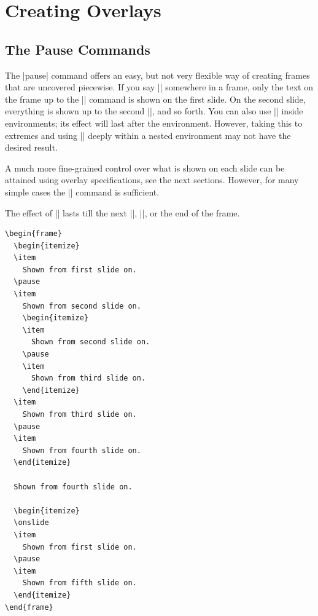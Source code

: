%
%
%

\section{Creating Overlays}
\label{section-overlay}


\subsection{The Pause Commands}

The |pause| command offers an easy, but not very flexible way of creating frames that are uncovered piecewise. If you say |\pause| somewhere in a frame, only the text on the frame up to the |\pause| command is shown on the first slide. On the second slide, everything is shown up to the second |\pause|, and so forth. You can also use |\pause| inside environments; its effect will last after the environment. However, taking this to extremes and using |\pause| deeply within a nested environment may not have the desired result.

A much more fine-grained control over what is shown on each slide can be attained using overlay specifications, see the next sections. However, for many simple cases the |\pause| command is sufficient.

The effect of |\pause| lasts till the next |\pause|, |\onslide|, or the end of the frame.
\begin{verbatim}
\begin{frame}
  \begin{itemize}
  \item
    Shown from first slide on.
  \pause
  \item
    Shown from second slide on.
    \begin{itemize}
    \item
      Shown from second slide on.
    \pause
    \item
      Shown from third slide on.
    \end{itemize}
  \item
    Shown from third slide on.
  \pause
  \item
    Shown from fourth slide on.
  \end{itemize}

  Shown from fourth slide on.

  \begin{itemize}
  \onslide
  \item
    Shown from first slide on.
  \pause
  \item
    Shown from fifth slide on.
  \end{itemize}
\end{frame}
\end{verbatim}


